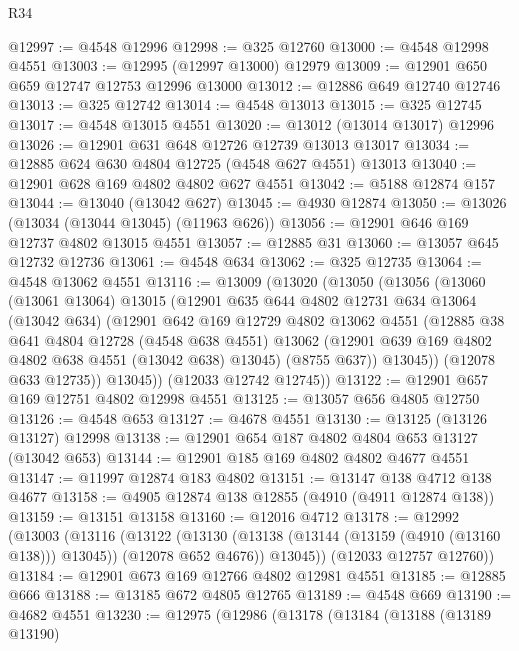 \begin{lexlean}{R34}
\begin{coremodule}
@12997 := @4548 @12996
@12998 := @325 @12760
@13000 := @4548 @12998 @4551
@13003 := @12995 (@12997 @13000) @12979
@13009 := @12901 @650 @659 @12747 @12753 @12996 @13000
@13012 := @12886 @649 @12740 @12746
@13013 := @325 @12742
@13014 := @4548 @13013
@13015 := @325 @12745
@13017 := @4548 @13015 @4551
@13020 := @13012 (@13014 @13017) @12996
@13026 := @12901 @631 @648 @12726 @12739 @13013 @13017
@13034 := @12885 @624 @630 @4804 @12725 (@4548 @627 @4551) @13013
@13040 := @12901 @628 @169 @4802 @4802 @627 @4551
@13042 := @5188 @12874 @157
@13044 := @13040 (@13042 @627)
@13045 := @4930 @12874
@13050 := @13026 (@13034 (@13044 @13045) (@11963 @626))
@13056 := @12901 @646 @169 @12737 @4802 @13015 @4551
@13057 := @12885 @31
@13060 := @13057 @645 @12732 @12736
@13061 := @4548 @634
@13062 := @325 @12735
@13064 := @4548 @13062 @4551
@13116 := @13009
    (@13020
      (@13050
        (@13056
          (@13060
            (@13061 @13064)
            @13015
            (@12901
              @635
              @644
              @4802
              @12731
              @634
              @13064
              (@13042 @634)
              (@12901
                @642
                @169
                @12729
                @4802
                @13062
                @4551
                (@12885
                  @38
                  @641
                  @4804
                  @12728
                  (@4548 @638 @4551)
                  @13062
                  (@12901 @639 @169 @4802 @4802 @638 @4551 (@13042 @638) @13045)
                  (@8755 @637))
                @13045))
            (@12078 @633 @12735))
          @13045))
      (@12033 @12742 @12745))
@13122 := @12901 @657 @169 @12751 @4802 @12998 @4551
@13125 := @13057 @656 @4805 @12750
@13126 := @4548 @653
@13127 := @4678 @4551
@13130 := @13125 (@13126 @13127) @12998
@13138 := @12901 @654 @187 @4802 @4804 @653 @13127 (@13042 @653)
@13144 := @12901 @185 @169 @4802 @4802 @4677 @4551
@13147 := @11997 @12874 @183 @4802
@13151 := @13147 @138 @4712 @138 @4677
@13158 := @4905 @12874 @138 @12855 (@4910 (@4911 @12874 @138))
@13159 := @13151 @13158
@13160 := @12016 @4712
@13178 := @12992
    (@13003
      (@13116
        (@13122
          (@13130 (@13138 (@13144 (@13159 (@4910 (@13160 @138))) @13045)) (@12078 @652 @4676))
          @13045))
      (@12033 @12757 @12760))
@13184 := @12901 @673 @169 @12766 @4802 @12981 @4551
@13185 := @12885 @666
@13188 := @13185 @672 @4805 @12765
@13189 := @4548 @669
@13190 := @4682 @4551
@13230 := @12975
    (@12986
      (@13178
        (@13184
          (@13188
            (@13189 @13190)

\end{coremodule}
\end{lexlean}
